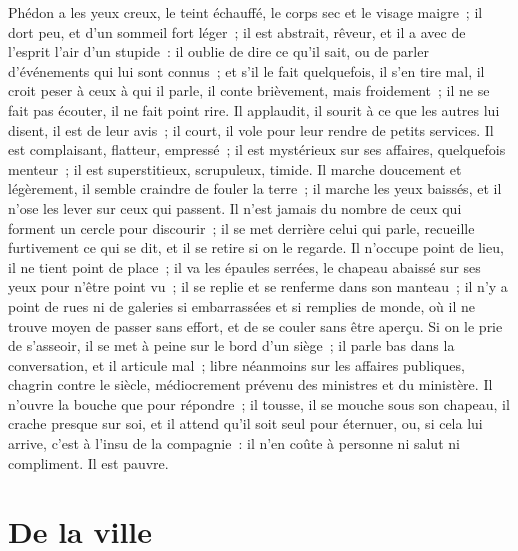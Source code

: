 \documentclass[french,twoside]{book} %
\newcommand\chapteropen{} %
\newcommand\chapterclose{} %
\begin{document}
Phédon a les yeux creux, le teint échauffé, le corps sec et le visage maigre ; il dort peu, et d’un sommeil fort léger ; il est abstrait, rêveur, et il a avec de l’esprit l’air d’un stupide : il oublie de dire ce qu’il sait, ou de parler d’événements qui lui sont connus ; et s’il le fait quelquefois, il s’en tire mal, il croit peser à ceux à qui il parle, il conte brièvement, mais froidement ; il ne se fait pas écouter, il ne fait point rire. Il applaudit, il sourit à ce que les autres lui disent, il est de leur avis ; il court, il vole pour leur rendre de petits services. Il est complaisant, flatteur, empressé ; il est mystérieux sur ses affaires, quelquefois menteur ; il est superstitieux, scrupuleux, timide. Il marche doucement et légèrement, il semble craindre de fouler la terre ; il marche les yeux baissés, et il n’ose les lever sur ceux qui passent. Il n’est jamais du nombre de ceux qui forment un cercle pour discourir ; il se met derrière celui qui parle, recueille furtivement ce qui se dit, et il se retire si on le regarde. Il n’occupe point de lieu, il ne tient point de place ; il va les épaules serrées, le chapeau abaissé sur ses yeux pour n’être point vu ; il se replie et se renferme dans son manteau ; il n’y a point de rues ni de galeries si embarrassées et si remplies de monde, où il ne trouve moyen de passer sans effort, et de se couler sans être aperçu. Si on le prie de s’asseoir, il se met à peine sur le bord d’un siège ; il parle bas dans la conversation, et il articule mal ; libre néanmoins sur les affaires publiques, chagrin contre le siècle, médiocrement prévenu des ministres et du ministère. Il n’ouvre la bouche que pour répondre ; il tousse, il se mouche sous son chapeau, il crache presque sur soi, et il attend qu’il soit seul pour éternuer, ou, si cela lui arrive, c’est à l’insu de la compagnie : il n’en coûte à personne ni salut ni compliment. Il est pauvre.
\chapterclose


\chapteropen
\chapter[{De la ville}]{De la ville}
\label{lb-ville}\renewcommand{\leftmark}{De la ville}
\end{document}
